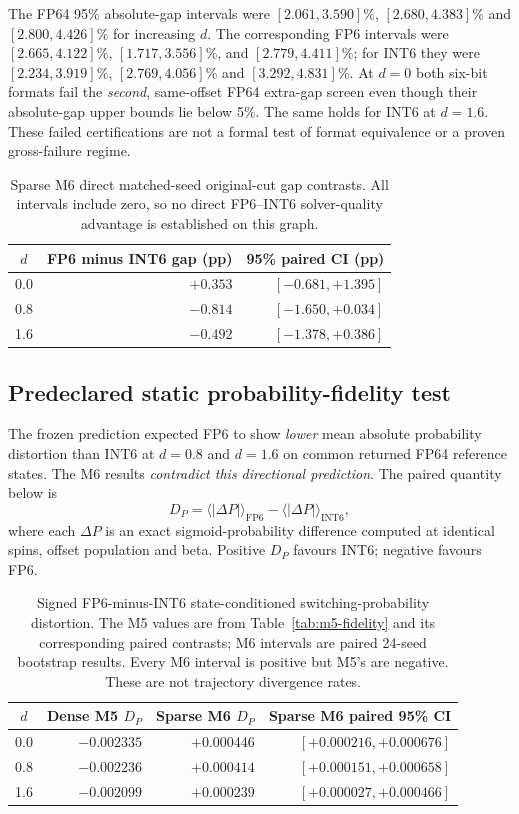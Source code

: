 The FP64 95\% absolute-gap intervals were $[2.061,3.590]\%$,
$[2.680,4.383]\%$ and $[2.800,4.426]\%$
for increasing $d$.
The corresponding FP6 intervals were $[2.665,4.122]\%$,
$[1.717,3.556]\%$, and $[2.779,4.411]\%$; for INT6
they were $[2.234,3.919]\%$, $[2.769,4.056]\%$ and
$[3.292,4.831]\%$. At $d=0$ both six-bit formats fail the
\emph{second}, same-offset FP64 extra-gap screen even though
their absolute-gap upper bounds lie below 5\%. The same holds
for INT6 at $d=1.6$. These failed certifications are not a
formal test of format equivalence or a proven gross-failure regime.

\begin{table}[htbp]\centering\small
\begin{tabular}{@{}c rr@{}}\toprule
$d$ & FP6 minus INT6 gap (pp) & 95\% paired CI (pp)\\\midrule
0.0 & $+0.353$ & $[-0.681,+1.395]$\\
0.8 & $-0.814$ & $[-1.650,+0.034]$\\
1.6 & $-0.492$ & $[-1.378,+0.386]$\\\bottomrule
\end{tabular}
\caption{Sparse M6 direct matched-seed original-cut gap contrasts.
All intervals include zero, so no direct FP6--INT6
solver-quality advantage is established on this graph.}
\label{tab:m6-paired}
\end{table}

\subsection{Predeclared static probability-fidelity test}
The frozen prediction expected FP6 to show \emph{lower} mean
absolute probability distortion than INT6 at $d=0.8$ and
$d=1.6$ on common returned FP64 reference states. The M6
results \emph{contradict this directional prediction}.
The paired quantity below is
\[
D_P=\langle|\Delta P|\rangle_{\mathrm{FP6}}
-\langle|\Delta P|\rangle_{\mathrm{INT6}},
\]
where each $\Delta P$ is an exact sigmoid-probability difference
computed at identical spins, offset population and beta.
Positive $D_P$ favours INT6; negative favours FP6.

\begin{table}[htbp]\centering\small
\begin{tabular}{@{}c rr r@{}}\toprule
$d$ & Dense M5 $D_P$ & Sparse M6 $D_P$
& Sparse M6 paired 95\% CI\\\midrule
0.0 & $-0.002335$ & $+0.000446$ &
$[+0.000216,+0.000676]$\\
0.8 & $-0.002236$ & $+0.000414$ &
$[+0.000151,+0.000658]$\\
1.6 & $-0.002099$ & $+0.000239$ &
$[+0.000027,+0.000466]$\\\bottomrule
\end{tabular}
\caption{Signed FP6-minus-INT6 state-conditioned switching-probability
distortion. The M5 values are from Table~\ref{tab:m5-fidelity}
and its corresponding paired contrasts; M6 intervals are
paired 24-seed bootstrap results. Every M6 interval is positive
but M5's are negative. These are not trajectory divergence rates.}
\label{tab:m6-fidelity}
\end{table}

